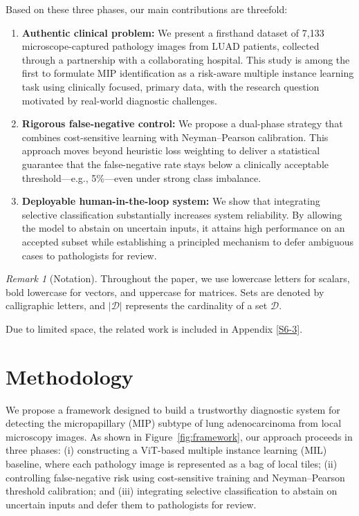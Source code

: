 \documentclass[sigconf,review,anonymous]{acmart}
\theoremstyle{remark}
\newtheorem{remark}[theorem]{Remark}
\begin{document}
Based on these three phases, our main contributions are threefold:
\begin{enumerate}
\item \textbf{Authentic clinical problem:} We present a firsthand dataset of 7,133 microscope-captured pathology images from LUAD patients, collected through a partnership with a collaborating hospital. This study is among the first to formulate MIP identification as a risk-aware multiple instance learning task using clinically focused, primary data, with the research question motivated by real-world diagnostic challenges.
\item \textbf{Rigorous false-negative control:} We propose a dual-phase strategy that combines cost-sensitive learning with Neyman–Pearson calibration. This approach moves beyond heuristic loss weighting to deliver a statistical guarantee that the false-negative rate stays below a clinically acceptable threshold—e.g., 5\%—even under strong class imbalance.
\item \textbf{Deployable human-in-the-loop system:} We show that integrating selective classification substantially increases system reliability. By allowing the model to abstain on uncertain inputs, it attains high performance on an accepted subset while establishing a principled mechanism to defer ambiguous cases to pathologists for review.
\end{enumerate}
\begin{remark}[Notation]
Throughout the paper, we use lowercase letters for scalars, bold lowercase for vectors, and uppercase for matrices. Sets are denoted by calligraphic letters, and $|\mathcal{D}|$ represents the cardinality of a set $\mathcal{D}$.
\end{remark}
Due to limited space, the related work is included in Appendix \ref{S6-3}.

\section{Methodology}\label{sec:methodology}

We propose a framework designed to build a trustworthy diagnostic system for detecting the micropapillary (MIP) subtype of lung adenocarcinoma from local microscopy images. As shown in Figure~\ref{fig:framework}, our approach proceeds in three phases: (i) constructing a ViT-based multiple instance learning (MIL) baseline, where each pathology image is represented as a bag of local tiles; (ii) controlling false-negative risk using cost-sensitive training and Neyman–Pearson threshold calibration; and (iii) integrating selective classification to abstain on uncertain inputs and defer them to pathologists for review.
\end{document}
